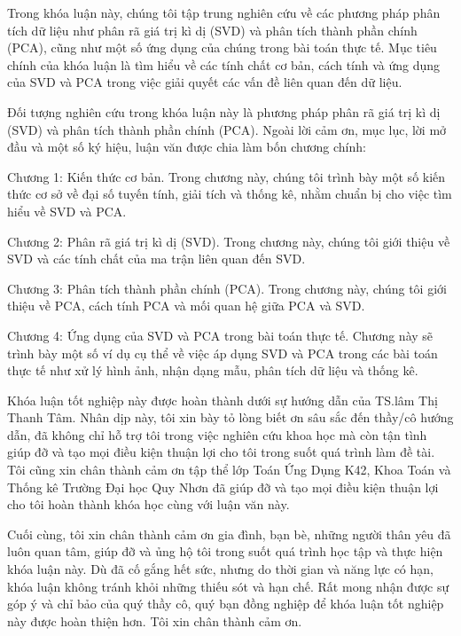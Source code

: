 \documentclass[14pt,oneside,a4paper]{report}
\numberwithin{equation}{section}
\begin{document}
	Trong khóa luận này, chúng tôi tập trung nghiên cứu về các phương pháp phân tích dữ liệu như phân rã giá trị kì dị (SVD) và phân tích thành phần chính (PCA), cũng như một số ứng dụng của chúng trong bài toán thực tế. Mục tiêu chính của khóa luận là tìm hiểu về các tính chất cơ bản, cách tính và ứng dụng của SVD và PCA trong việc giải quyết các vấn đề liên quan đến dữ liệu.
	
	Đối tượng nghiên cứu trong khóa luận này là phương pháp phân rã giá trị kì dị (SVD) và phân tích thành phần chính (PCA). Ngoài lời cảm ơn, mục lục, lời mở đầu và một số ký hiệu, luận văn được chia làm bốn chương chính:
	
	Chương 1: Kiến thức cơ bản. Trong chương này, chúng tôi trình bày một số kiến thức cơ sở về đại số tuyến tính, giải tích và thống kê, nhằm chuẩn bị cho việc tìm hiểu về SVD và PCA.
	
	Chương 2: Phân rã giá trị kì dị (SVD). Trong chương này, chúng tôi giới thiệu về SVD và các tính chất của ma trận liên quan đến SVD.
	
	Chương 3: Phân tích thành phần chính (PCA). Trong chương này, chúng tôi giới thiệu về PCA, cách tính PCA và mối quan hệ giữa PCA và SVD.
	
	Chương 4: Ứng dụng của SVD và PCA trong bài toán thực tế. Chương này sẽ trình bày một số ví dụ cụ thể về việc áp dụng SVD và PCA trong các bài toán thực tế như xử lý hình ảnh, nhận dạng mẫu, phân tích dữ liệu và thống kê.
	
	Khóa luận tốt nghiệp này được hoàn thành dưới sự hướng dẫn của TS.lâm Thị Thanh Tâm. Nhân dịp này, tôi xin bày tỏ lòng biết ơn sâu sắc đến thầy/cô hướng dẫn, đã không chỉ hỗ trợ tôi trong việc nghiên cứu khoa học mà còn tận tình giúp đỡ và tạo mọi điều kiện thuận lợi cho tôi trong suốt quá trình làm đề tài. Tôi cũng xin chân thành cảm ơn tập thể lớp Toán Ứng Dụng K42, Khoa Toán và Thống kê Trường Đại học Quy Nhơn đã giúp đỡ và tạo mọi điều kiện thuận lợi cho tôi hoàn thành khóa học cùng với luận văn này.
	
	Cuối cùng, tôi xin chân thành cảm ơn gia đình, bạn bè, những người thân yêu đã luôn quan tâm, giúp đỡ và ủng hộ tôi trong suốt quá trình học tập và thực hiện khóa luận này. Dù đã cố gắng hết sức, nhưng do thời gian và năng lực có hạn, khóa luận không tránh khỏi những thiếu sót và hạn chế. Rất mong nhận được sự góp ý và chỉ bảo của quý thầy cô, quý bạn đồng nghiệp để khóa luận tốt nghiệp này được hoàn thiện hơn. Tôi xin chân thành cảm ơn.
\end{document}
